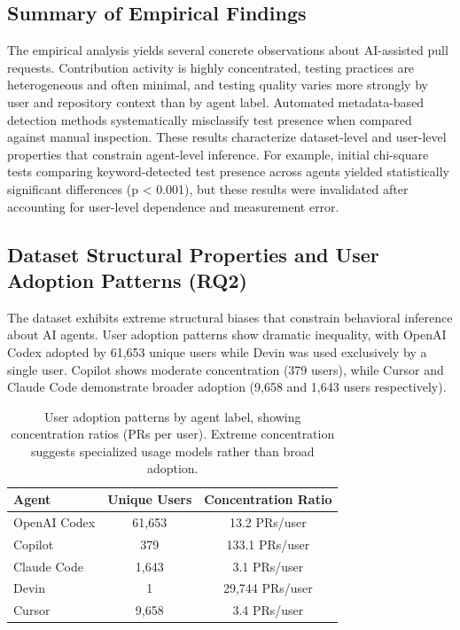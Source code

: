 \documentclass[conference]{IEEEtran}
\begin{document}
\subsection{Summary of Empirical Findings}
The empirical analysis yields several concrete observations about AI-assisted pull requests. Contribution activity is highly concentrated, testing practices are heterogeneous and often minimal, and testing quality varies more strongly by user and repository context than by agent label. Automated metadata-based detection methods systematically misclassify test presence when compared against manual inspection. These results characterize dataset-level and user-level properties that constrain agent-level inference. For example, initial chi-square tests comparing keyword-detected test presence across agents yielded statistically significant differences (p < 0.001), but these results were invalidated after accounting for user-level dependence and measurement error.

\subsection{Dataset Structural Properties and User Adoption Patterns (RQ2)}

The dataset exhibits extreme structural biases that constrain behavioral inference about AI agents. User adoption patterns show dramatic inequality, with OpenAI Codex adopted by 61,653 unique users while Devin was used exclusively by a single user. Copilot shows moderate concentration (379 users), while Cursor and Claude Code demonstrate broader adoption (9,658 and 1,643 users respectively).

\begin{table}[ht]
\centering
\caption{User adoption patterns by agent label, showing concentration ratios (PRs per user). Extreme concentration suggests specialized usage models rather than broad adoption.}
\begin{tabular}{lcc}
\toprule
Agent & Unique Users & Concentration Ratio \\
\midrule
OpenAI Codex & 61,653 & 13.2 PRs/user \\
Copilot & 379 & 133.1 PRs/user \\
Claude Code & 1,643 & 3.1 PRs/user \\
Devin & 1 & 29,744 PRs/user \\
Cursor & 9,658 & 3.4 PRs/user \\
\bottomrule
\end{tabular}
\label{tab:user_patterns}
\end{table}
\end{document}
